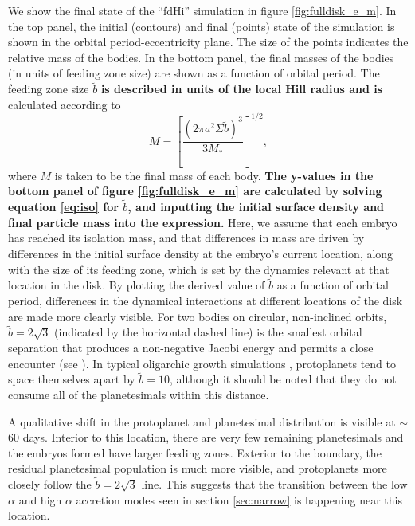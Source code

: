 \documentclass[twocolumn,linenumbers]{aastex63}
\begin{document}
We show the final state of the ``fdHi'' simulation in figure \ref{fig:fulldisk_e_m}. In the top panel,
the initial (contours) and final (points) state of the simulation is
shown in the orbital period-eccentricity plane. The size of the points
indicates the relative mass of the bodies. In the bottom panel, the
final masses of the bodies (in units of feeding zone size) are shown
as a function of orbital period. The feeding zone size $\tilde{b}$ \textbf{is described in units of the local Hill radius and is} calculated according to \citet{kokubo02}
\begin{equation}\label{eq:iso}
	M = \left[ \frac{\left( 2 \pi a^2 \Sigma \tilde{b} \right)^3}{3 M_{*}} \right]^{1/2},
\end{equation}
where $M$ is taken to be the final mass of each body. \textbf{The y-values in the bottom panel of figure \ref{fig:fulldisk_e_m} are calculated by solving equation \ref{eq:iso} for $\tilde{b}$, and inputting the initial surface density and final particle mass into the expression.} Here, we assume that each embryo has reached its isolation mass, and 
that differences in mass are driven by differences in the initial surface density at the embryo's current location, along with the 
size of its feeding zone, which is set by the dynamics relevant at that location in the disk. By plotting the derived value of $
\tilde{b}$ as a function of orbital period, differences in the dynamical interactions at different locations of the disk are made more 
clearly visible. For two bodies on circular, non-inclined orbits,  $\tilde{b} = 2
\sqrt{3}$ (indicated by the horizontal dashed line) is the smallest orbital separation that produces a non-negative Jacobi energy
and permits a close encounter (see \citet{naka88}). In typical oligarchic growth simulations \citep{kokubo98}, protoplanets tend 
to space themselves apart by $\tilde{b} = 10$, although it should be noted that they do not consume all of the planetesimals 
within this distance.

A qualitative shift in the protoplanet and planetesimal distribution is visible at $\sim$ 60 days. Interior to this location, there are 
very few remaining planetesimals and the embryos formed have larger feeding zones. Exterior to the boundary, the residual 
planetesimal population is much more visible, and protoplanets more closely follow the $\tilde{b} = 2 \sqrt{3}$ line. This 
suggests that the transition between the low $\alpha$ and high $\alpha$ accretion modes seen in section \ref{sec:narrow} 
is happening near this location.
\end{document}
